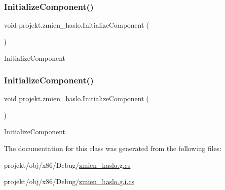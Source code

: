 \subsubsection{\texorpdfstring{Initialize\+Component()}{InitializeComponent()}\hspace{0.1cm}{\footnotesize\ttfamily [1/2]}}
{\footnotesize\ttfamily void projekt.\+zmien\+\_\+haslo.\+Initialize\+Component (\begin{DoxyParamCaption}{ }\end{DoxyParamCaption})\hspace{0.3cm}{\ttfamily [inline]}}



Initialize\+Component 

\mbox{\label{classprojekt_1_1zmien__haslo_a64564a406e807cedb10ae430ccf00577}} 
\subsubsection{\texorpdfstring{Initialize\+Component()}{InitializeComponent()}\hspace{0.1cm}{\footnotesize\ttfamily [2/2]}}
{\footnotesize\ttfamily void projekt.\+zmien\+\_\+haslo.\+Initialize\+Component (\begin{DoxyParamCaption}{ }\end{DoxyParamCaption})\hspace{0.3cm}{\ttfamily [inline]}}



Initialize\+Component 



The documentation for this class was generated from the following files\+:\begin{DoxyCompactItemize}
\item 
projekt/obj/x86/\+Debug/\mbox{\hyperlink{zmien__haslo_8g_8cs}{zmien\+\_\+haslo.\+g.\+cs}}\item 
projekt/obj/x86/\+Debug/\mbox{\hyperlink{zmien__haslo_8g_8i_8cs}{zmien\+\_\+haslo.\+g.\+i.\+cs}}\end{DoxyCompactItemize}
